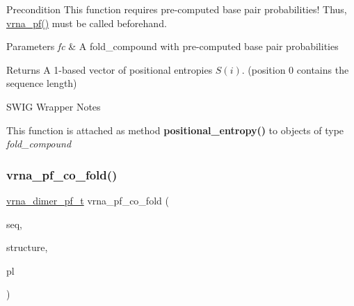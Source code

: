 \begin{DoxyPrecond}{Precondition}
This function requires pre-\/computed base pair probabilities! Thus, \mbox{\hyperlink{group__part__func__global_ga29e256d688ad221b78d37f427e0e99bc}{vrna\+\_\+pf()}} must be called beforehand.
\end{DoxyPrecond}

\begin{DoxyParams}{Parameters}
{\em fc} & A fold\+\_\+compound with pre-\/computed base pair probabilities \\
\hline
\end{DoxyParams}
\begin{DoxyReturn}{Returns}
A 1-\/based vector of positional entropies $ S(i) $. (position 0 contains the sequence length)
\end{DoxyReturn}
\begin{DoxyRefDesc}{S\+W\+I\+G Wrapper Notes}
\item[\mbox{\hyperlink{wrappers__wrappers000113}{S\+W\+I\+G Wrapper Notes}}]This function is attached as method {\bfseries{positional\+\_\+entropy()}} to objects of type {\itshape fold\+\_\+compound} \end{DoxyRefDesc}
\mbox{\label{group__part__func__global_gaf2b846f7ac382686f35ff7b9202fdd5c}} 
\subsubsection{\texorpdfstring{vrna\_pf\_co\_fold()}{vrna\_pf\_co\_fold()}}
{\footnotesize\ttfamily \mbox{\hyperlink{group__pf__cofold_ga444df1587c9a2ca15b8eb25188f629c3}{vrna\+\_\+dimer\+\_\+pf\+\_\+t}} vrna\+\_\+pf\+\_\+co\+\_\+fold (\begin{DoxyParamCaption}\item[{const char $\ast$}]{seq,  }\item[{char $\ast$}]{structure,  }\item[{\mbox{\hyperlink{group__struct__utils__plist_gab9ac98ab55ded9fb90043b024b915aca}{vrna\+\_\+ep\+\_\+t}} $\ast$$\ast$}]{pl }\end{DoxyParamCaption})}



